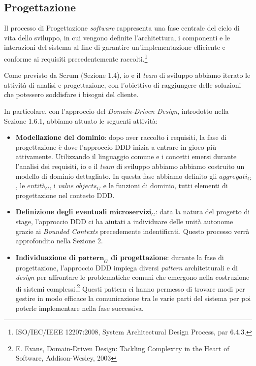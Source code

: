         \subsection{Progettazione}
        Il processo di Progettazione \textit{software} rappresenta una fase centrale del ciclo di vita dello sviluppo, in cui vengono definite l'architettura, i componenti e le interazioni del sistema al fine di garantire un’implementazione efficiente e conforme ai requisiti precedentemente raccolti.\footnote{ISO/IEC/IEEE 12207:2008, System Architectural Design Process, par 6.4.3.} 
        
        \noindent Come previsto da Scrum (Sezione 1.4), io e il \textit{team} di sviluppo abbiamo iterato le attività di analisi e progettazione, con l'obiettivo di raggiungere delle soluzioni che potessero soddisfare i bisogni del cliente.
        
        \noindent In particolare, con l'approccio del \textit{Domain-Driven Design}, introdotto nella Sezione 1.6.1, abbiamo attuato le seguenti attività:
        \begin{itemize}
            \item \textbf{Modellazione del dominio}: dopo aver raccolto i requisiti, la fase di progettazione è dove l'approccio DDD inizia a entrare in gioco più attivamente. Utilizzando il linguaggio comune e i concetti emersi durante l'analisi dei requisiti, io e il \textit{team} di sviluppo abbiamo abbiamo costruito un modello di dominio dettagliato. In questa fase abbiamo definito gli $aggregati_G$, le $entità_G$, i \textit{value $objects_G$} e le funzioni di dominio, tutti elementi di progettazione nel contesto DDD. 
            \item \textbf{Definizione degli eventuali $\textbf{microservizi}_G$}: data la natura del progetto di stage, l'approccio DDD ci ha aiutati a individuare delle unità autonome grazie ai \textit{Bounded Contexts} precedemente indentificati. Questo processo verrà approfondito nella Sezione 2.
            \item \textbf{Individuazione di $\textbf{pattern}_G$ di progettazione}: durante la fase di progettazione, l’approccio DDD impiega diversi \textit{pattern} architetturali e di \textit{design} per affrontare le problematiche comuni che emergono nella costruzione di sistemi complessi.\footnote{E. Evans, Domain-Driven Design: Tackling Complexity in the Heart of Software, Addison-Wesley, 2003} Questi pattern ci hanno permesso di trovare modi per gestire in modo efficace la comunicazione tra le varie parti del sistema per poi poterle implementare nella fase successiva.
        \end{itemize}
        
